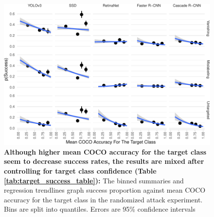 \begin{figure}[tb]

{\centering \includegraphics{imgs/target_success_graph-1} 

}

\caption{\textbf{Although higher mean COCO accuracy for the target class seem to decrease success rates, the results are mixed after controlling for target class confidence (Table \ref{tab:target_success_table}):}  The binned summaries and regression trendlines graph success proportion against mean COCO accuracy for the target class in the randomized attack experiment. Bins are split into quantiles. Errors are 95\% confidence intervals}\label{fig:target_success_graph}
\end{figure}

\begingroup\fontsize{9}{11}\selectfont

